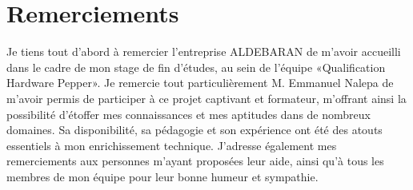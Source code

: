 \chapter*{Remerciements}

Je tiens tout d'abord à remercier l'entreprise ALDEBARAN de m'avoir accueilli dans le cadre de mon stage de fin d'études, au sein de l'équipe «Qualification Hardware Pepper».
Je remercie tout particulièrement M. Emmanuel Nalepa de m'avoir permis de participer à ce projet captivant et formateur, m’offrant ainsi la possibilité d'étoffer mes connaissances et mes aptitudes dans de nombreux domaines. Sa disponibilité, sa pédagogie et son expérience ont été des atouts essentiels à mon enrichissement technique.
J’adresse également mes remerciements aux personnes m'ayant proposées leur aide, ainsi qu'à tous les membres de mon équipe pour leur bonne humeur et sympathie.